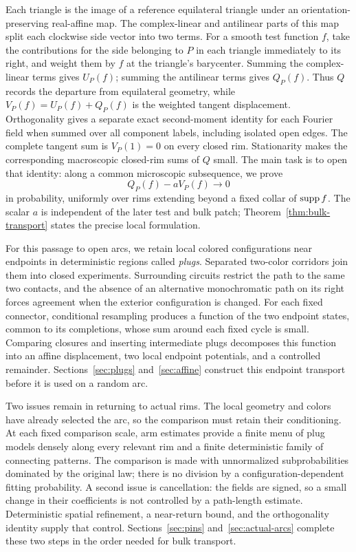 Each triangle is the image of a reference equilateral triangle under
an orientation-preserving real-affine map. The complex-linear and
antilinear parts of this map split each clockwise side vector into two
terms. For a smooth test function $f$, take the contributions for the
side belonging to $P$ in each triangle immediately to its right, and
weight them by $f$ at the triangle's barycenter. Summing the complex-linear
terms gives $U_P(f)$; summing the antilinear terms gives $Q_P(f)$.
Thus $Q$ records the departure from equilateral geometry, while
$V_P(f)=U_P(f)+Q_P(f)$ is the weighted tangent displacement. Orthogonality gives a separate exact second-moment
identity for each Fourier field when summed over all component labels,
including isolated open edges.
The complete tangent sum is $V_P(1)=0$ on every closed rim.
Stationarity makes the corresponding macroscopic closed-rim sums of $Q$
small. The main task is to open that identity: along a common microscopic
subsequence, we prove
\[
                    Q_P(f)-aV_P(f)\longrightarrow0
\]
in probability, uniformly over rims extending beyond a fixed collar of
$\operatorname{supp} f$. The scalar $a$ is independent of the later test and bulk patch;
Theorem~\ref{thm:bulk-transport} states the precise local formulation.

For this passage to open arcs, we retain local colored configurations near
endpoints in deterministic regions called \emph{plugs}. Separated
two-color corridors join them into closed experiments. Surrounding circuits restrict the path to the same two contacts, and the
absence of an alternative monochromatic path on its right forces agreement
when the exterior configuration is changed. For each fixed connector, conditional resampling produces a function of
the two endpoint states, common to its completions, whose sum around each
fixed cycle is small.
Comparing closures and inserting intermediate plugs decomposes this
function into an affine displacement, two local endpoint potentials, and
a controlled remainder. Sections~\ref{sec:plugs} and~\ref{sec:affine}
construct this endpoint transport before it is used on a random arc.

Two issues remain in returning to actual rims. The local geometry and
colors have already selected the arc, so the comparison must retain their
conditioning. At each fixed comparison scale, arm estimates provide a
finite menu of plug models densely along every relevant rim and a finite
deterministic family of connecting patterns. The comparison is made with
unnormalized subprobabilities dominated by the original law; there is no
division by a configuration-dependent fitting probability. A second issue
is cancellation: the fields are signed, so a small change in their
coefficients is not controlled by a path-length estimate. Deterministic
spatial refinement, a near-return bound, and the orthogonality identity
supply that control. Sections~\ref{sec:pins} and~\ref{sec:actual-arcs}
complete these two steps in the order needed for bulk transport.

